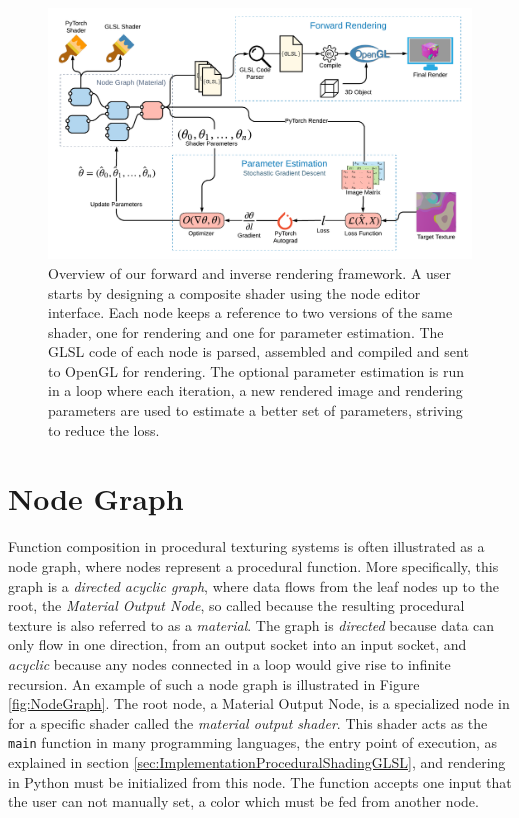 \begin{figure}[h]
    \centering
    \includegraphics[width=1.0\textwidth]{img/method/System Overview.pdf}
    \caption{Overview of our forward and inverse rendering framework. A user starts by designing a composite shader using the node editor interface. Each node keeps a reference to two versions of the same shader, one for rendering and one for parameter estimation. The GLSL code of each node is parsed, assembled and compiled and sent to OpenGL for rendering. The optional parameter estimation is run in a loop where each iteration, a new rendered image and rendering parameters are used to estimate a better set of parameters, striving to reduce the loss.}
    \label{fig:SystemOverview}
\end{figure}

\section{Node Graph}

Function composition in procedural texturing systems is often illustrated as a node graph, where nodes represent a procedural function. More specifically, this graph is a \textit{directed acyclic graph}, where data flows from the leaf nodes up to the root, the \textit{Material Output Node}, so called because the resulting procedural texture is also referred to as a \textit{material}. The graph is \textit{directed} because data can only flow in one direction, from an output socket into an input socket, and \textit{acyclic} because any nodes connected in a loop would give rise to infinite recursion. An example of such a node graph is illustrated in Figure \ref{fig:NodeGraph}. The root node, a Material Output Node, is a specialized node in \dipter{} for a specific shader called the \textit{material output shader}. This shader acts as the \texttt{main} function in many programming languages, the entry point of execution, as explained in section \ref{sec:ImplementationProceduralShadingGLSL}, and rendering in Python must be initialized from this node. The function accepts one input that the user can not manually set, a color which must be fed from another node.

